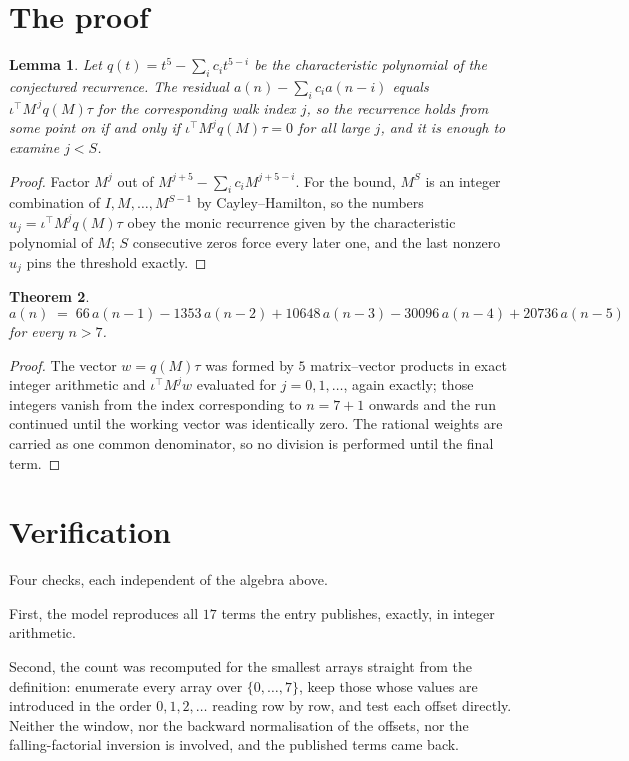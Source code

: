 \documentclass[11pt,a4paper]{article}
\theoremstyle{plain}
\newtheorem{theorem}{Theorem}
\newtheorem{lemma}[theorem]{Lemma}
\theoremstyle{definition}
\begin{document}
\section{The proof}

\begin{lemma}\label{lem:crit}
Let $q(t)=t^{5}-\sum_i c_it^{5-i}$ be the characteristic polynomial of the
conjectured recurrence. The residual $a(n)-\sum_ic_ia(n-i)$ equals
$\iota^{\!\top}M^{\,j}q(M)\tau$ for the corresponding walk index $j$, so the recurrence
holds from some point on if and only if $\iota^{\!\top}M^{j}q(M)\tau=0$ for all large $j$,
and it is enough to examine $j<S$.
\end{lemma}

\begin{proof}
Factor $M^{j}$ out of $M^{j+5}-\sum_ic_iM^{j+5-i}$. For the bound, $M^{S}$
is an integer combination of $I,M,\dots,M^{S-1}$ by Cayley--Hamilton, so the numbers
$u_j=\iota^{\!\top}M^{j}q(M)\tau$ obey the monic recurrence given by the characteristic
polynomial of $M$; $S$ consecutive zeros force every later one, and the last nonzero $u_j$
pins the threshold exactly.
\end{proof}

\begin{theorem}
\[
a(n)\;=\;66\,a(n-1) - 1353\,a(n-2) + 10648\,a(n-3) - 30096\,a(n-4) + 20736\,a(n-5)
\]
for every $n>7$.
\end{theorem}

\begin{proof}
The vector $w=q(M)\tau$ was formed by $5$ matrix--vector products in exact integer
arithmetic and $\iota^{\!\top}M^{j}w$ evaluated for $j=0,1,\dots$, again exactly; those
integers vanish from the index corresponding to $n=7+1$ onwards and the run continued
until the working vector was identically zero. The rational weights are carried as one common
denominator, so no division is performed until the final term.
\end{proof}

\section{Verification}

Four checks, each independent of the algebra above.

First, the model reproduces all $17$ terms the entry publishes, exactly, in integer
arithmetic.

Second, the count was recomputed for the smallest arrays straight from the definition:
enumerate every array over $\{0,\dots,7\}$, keep those whose values are introduced in the
order $0,1,2,\dots$ reading row by row, and test each offset directly. Neither the window, nor
the backward normalisation of the offsets, nor the falling-factorial inversion is involved, and
the published terms came back.
\end{document}
